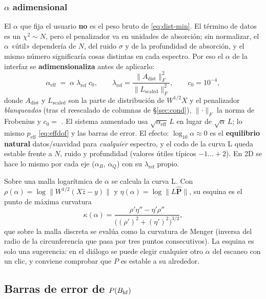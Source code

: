 \subsubsection{$\alpha$ adimensional}\label{sec:alpha-dimless}
El $\alpha$ que fija el usuario \textbf{no} es el peso bruto de \eqref{eq:dist-min}.
El término de datos es un $\chi^2\sim N$, pero el penalizador va en unidades de
absorción; sin normalizar, el $\alpha$ «útil» dependería de $N$, del ruido
$\sigma$ y de la profundidad de absorción, y el mismo número significaría cosas
distintas en cada espectro. Por eso el $\alpha$ de la interfaz se
\textbf{adimensionaliza} antes de aplicarlo:
\begin{equation}
  \alpha_{\text{eff}} \;=\; \alpha\;\lambda_{\text{ref}}\;c_0,
  \qquad
  \lambda_{\text{ref}} = \frac{\lVert A_{\text{dist}}\rVert_F^2}{\lVert L_{\text{scaled}}\rVert_F^2},
  \qquad c_0 = 10^{-4},
\end{equation}
donde $A_{\text{dist}}$ y $L_{\text{scaled}}$ son la parte de distribución de
$W^{1/2}X$ y el penalizador \emph{blanqueados} (tras el reescalado de columnas de
\S\ref{sec:cond}), $\lVert\cdot\rVert_F$ la norma de Frobenius y $c_0=$
. El sistema aumentado usa $\sqrt{\alpha_{\text{eff}}}\,L$
en lugar de $\sqrt\alpha\,L$; lo mismo $p_{\text{eff}}$ \eqref{eq:effdof} y las
barras de error. El efecto: $\log_{10}\alpha\approx 0$ es el \textbf{equilibrio
natural} datos/suavidad para \emph{cualquier} espectro, y el codo de la curva L
queda estable frente a $N$, ruido y profundidad (valores útiles típicos
$-1\ldots+2$). En 2D se hace lo mismo por cada eje ($\alpha_B$, $\alpha_Q$) con su
$\lambda_{\text{ref}}$ propio.

\medskip
Sobre una malla logarítmica de $\alpha$ se calcula la curva L. Con
$\rho(\alpha)=\log\lVert W^{1/2}(X\hat z-y)\rVert$ y
$\eta(\alpha)=\log\lVert L\hat{\bm P}\rVert$, su esquina es el punto de máxima
curvatura
\begin{equation}
  \kappa(\alpha)=\frac{\rho'\eta''-\eta'\rho''}{\bigl((\rho')^2+(\eta')^2\bigr)^{3/2}},
\end{equation}
que sobre la malla discreta se evalúa como la curvatura de Menger (inversa del
radio de la circunferencia que pasa por tres puntos consecutivos). La esquina es
solo una sugerencia: en el diálogo se puede elegir cualquier otro $\alpha$ del
escaneo con un clic, y conviene comprobar que $P$ es estable a su alrededor.

\subsection{Barras de error de \texorpdfstring{$P(B_{\mathrm{hf}})$}{P(BHF)}}\label{sec:perr}

